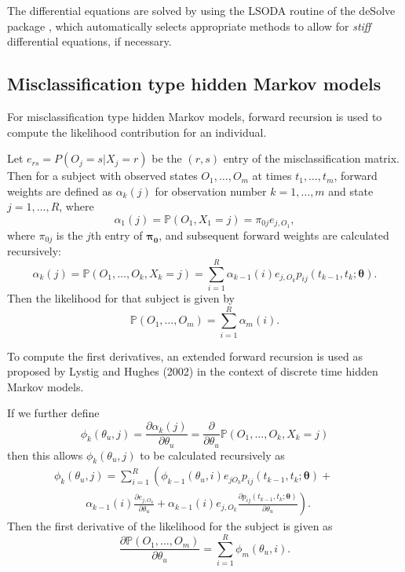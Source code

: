 \documentclass{article}
\newcommand{\prob}{\mathbb{P}}
\numberwithin{equation}{section}
\begin{document}
The differential equations are solved by using the LSODA routine \cite{lsoda} of the deSolve package \cite{deSolve}, which automatically selects appropriate methods to allow for {\it stiff} differential equations, if necessary.

\subsection{Misclassification type hidden Markov models}

For misclassification type hidden Markov models, forward recursion is used to compute the likelihood contribution for an individual. 

Let $e_{rs} = P(O_j = s | X_j = r)$ be the $(r,s)$ entry of the misclassification matrix. Then for a subject with observed states $O_1,\ldots,O_m$ at times $t_1,\ldots,t_m$, forward weights are defined as $\alpha_{k}(j)$ for observation number $k=1,\ldots,m$ and state $j=1,\ldots,R$, where
\begin{displaymath}\alpha_{1}(j) = \prob(O_{1}, X_{1}=j) = \pi_{0j}e_{j,O_{1}},\end{displaymath}
where $\pi_{0j}$ is the $j$th entry of $\mathbf{\pi_{0}}$, and subsequent forward weights are calculated recursively:
\begin{displaymath}\alpha_{k}(j) = \prob(O_{1},\ldots,O_{k}, X_{k}=j) = \sum_{i=1}^{R} \alpha_{k-1}(i)e_{j,O_{k}}p_{ij}(t_{k-1},t_{k} ; \bm\theta).\end{displaymath}
Then the likelihood for that subject is given by
\begin{displaymath}\prob(O_{1},\ldots,O_{m}) = \sum_{i=1}^{R} \alpha_{m}(i).\end{displaymath}

To compute the first derivatives, an extended forward recursion is used as proposed by Lystig and Hughes (2002) \cite{lystig} in the context of discrete time hidden Markov models. 

If we further define
\begin{displaymath}\phi_{k}(\theta_{u},j) = \frac{\partial \alpha_{k}(j)}{\partial \theta_{u}} = \frac{\partial}{\partial \theta_{u}} \prob(O_1,\ldots,O_k,X_k = j)\end{displaymath}
then this allows $\phi_{k}(\theta_{u},j)$ to be calculated recursively as
\begin{equation}
\begin{split}
\phi_{k}(\theta_{u},j) = \sum_{i=1}^{R} \left( \phi_{k-1}(\theta_{u},i)e_{jO_{k}}p_{ij}(t_{k-1},t_{k} ; \bm\theta) + \phantom{\frac{~}{~}} ~~~~~~~~ \right. \\ \left. ~~~~~~~~~~~~~ \alpha_{k-1}(i)\frac{\partial e_{j,O_{k}}}{\partial \theta_{u}} + \alpha_{k-1}(i)e_{j,O_{k}}\frac{\partial p_{ij}(t_{k-1},t_{k};\bm\theta)}{\partial \theta_{u}} \right).
\end{split}\end{equation}
Then the first derivative of the likelihood for the subject is given as
\begin{displaymath}\frac{\partial \prob(O_1,\ldots,O_{m})}{\partial \theta_u} = \sum_{i=1}^{R} \phi_{m}(\theta_u,i).\end{displaymath}
\end{document}
